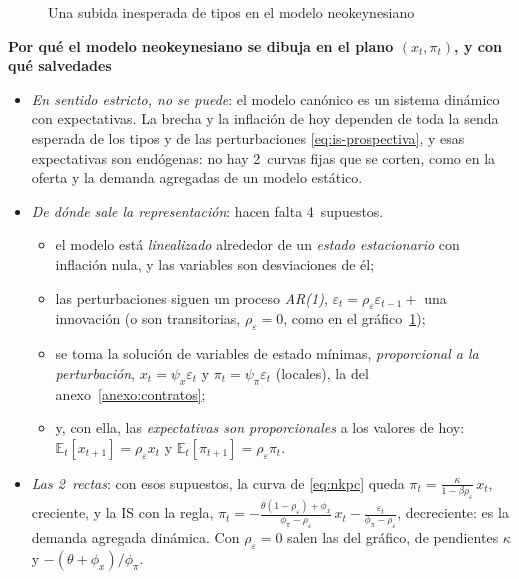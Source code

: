 \documentclass[11pt]{article}
\begin{document}
\begin{figure}[H]
\centering
\caption{Una subida inesperada de tipos en el modelo neokeynesiano}\label{fig:nek-perturbacion-monetaria}
\end{figure}

\begin{anotaciones}
\textbf{Por qué el modelo neokeynesiano se dibuja en el plano $(x_t,\pi_t)$, y con qué salvedades}
\begin{itemize}
\item \emph{En sentido estricto, no se puede}: el modelo canónico es un sistema dinámico con expectativas. La brecha y la inflación de hoy dependen de toda la senda esperada de los tipos y de las perturbaciones \eqref{eq:is-prospectiva}, y esas expectativas son endógenas: no hay 2~curvas fijas que se corten, como en la oferta y la demanda agregadas de un modelo estático.
\item \emph{De dónde sale la representación}: hacen falta 4~supuestos.
  \begin{itemize}
  \item el modelo está \emph{linealizado} alrededor de un \emph{estado estacionario} con inflación nula, y las variables son desviaciones de él;
  \item las perturbaciones siguen un proceso \emph{AR(1)}, $\varepsilon_t=\rho_\varepsilon\varepsilon_{t-1}+$ una innovación (o son transitorias, $\rho_\varepsilon=0$, como en el gráfico~\ref{fig:nek-perturbacion-monetaria});
  \item se toma la solución de variables de estado mínimas, \emph{proporcional a la perturbación}, $x_t=\psi_x\varepsilon_t$ y $\pi_t=\psi_\pi\varepsilon_t$ (locales), la del anexo~\ref{anexo:contratos};
  \item y, con ella, las \emph{expectativas son proporcionales} a los valores de hoy: $\mathbb{E}_t[x_{t+1}]=\rho_\varepsilon x_t$ y $\mathbb{E}_t[\pi_{t+1}]=\rho_\varepsilon\pi_t$.
  \end{itemize}
\item \emph{Las 2~rectas}: con esos supuestos, la curva de  \eqref{eq:nkpc} queda $\pi_t=\frac{\kappa}{1-\beta\rho_\varepsilon}\,x_t$, creciente, y la IS con la regla, $\pi_t=-\frac{\theta(1-\rho_\varepsilon)+\phi_x}{\phi_\pi-\rho_\varepsilon}\,x_t-\frac{\varepsilon_t}{\phi_\pi-\rho_\varepsilon}$, decreciente: es la demanda agregada dinámica. Con $\rho_\varepsilon=0$ salen las del gráfico, de pendientes $\kappa$ y $-(\theta+\phi_x)/\phi_\pi$.

\end{itemize}
\end{anotaciones}
\end{document}
